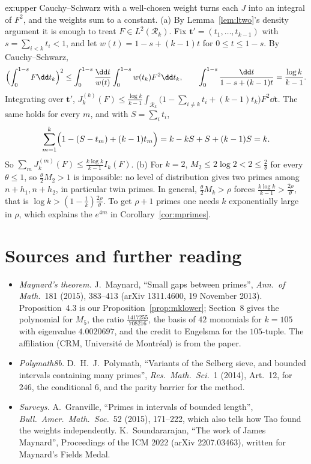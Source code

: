 \begin{solution}{ex:upper}
\idea Cauchy--Schwarz with a well-chosen weight turns each $J$ into an integral of $F^2$, and the weights sum to a constant.
\writeup (a) By Lemma~\ref{lem:ltwo}'s density argument it is enough to treat $F\in L^2(\mathcal R_k)$. Fix $\mathbf t'=(t_1,\dots,t_{k-1})$ with $s=\sum_{i<k}t_i<1$, and let $w(t)=1-s+(k-1)t$ for $0\le t\le1-s$. By Cauchy--Schwarz,
\[
\Bigl(\int_0^{1-s}F\dd t_k\Bigr)^2\le\int_0^{1-s}\frac{\dd t}{w(t)}\int_0^{1-s}w(t_k)F^2\dd t_k,\qquad\int_0^{1-s}\frac{\dd t}{1-s+(k-1)t}=\frac{\log k}{k-1}.
\]
Integrating over $\mathbf t'$, $J_k^{(k)}(F)\le\frac{\log k}{k-1}\int_{\mathcal R_k}\bigl(1-\sum_{i\ne k}t_i+(k-1)t_k\bigr)F^2\dd\mathbf t$. The same holds for every $m$, and with $S=\sum_it_i$,
\[
\sum_{m=1}^k\Bigl(1-(S-t_m)+(k-1)t_m\Bigr)=k-kS+S+(k-1)S=k.
\]
So $\sum_mJ_k^{(m)}(F)\le\frac{k\log k}{k-1}I_k(F)$.
(b) For $k=2$, $M_2\le2\log2<2\le\frac2\theta$ for every $\theta\le1$, so $\frac\theta2M_2>1$ is impossible: no level of distribution gives two primes among $n+h_1,n+h_2$, in particular twin primes. In general, $\frac\theta2M_k>\rho$ forces $\frac{k\log k}{k-1}>\frac{2\rho}\theta$, that is $\log k>(1-\frac1k)\frac{2\rho}\theta$. To get $\rho+1$ primes one needs $k$ exponentially large in $\rho$, which explains the $e^{4m}$ in Corollary~\ref{cor:mprimes}.
\end{solution}

\section*{Sources and further reading}

\begin{itemize}
\item \emph{Maynard's theorem.} J.~Maynard, ``Small gaps between primes'', \emph{Ann.\ of Math.}\ 181 (2015), 383--413 (arXiv 1311.4600, 19 November 2013). Proposition~4.3 is our Proposition~\ref{prop:mklower}; Section~8 gives the polynomial for $M_5$, the ratio $\frac{1417255}{708216}$, the basis of $42$ monomials for $k=105$ with eigenvalue $4.0020697$, and the credit to Engelsma for the $105$-tuple. The affiliation (CRM, Université de Montréal) is from the paper.
\item \emph{Polymath8b.} D.~H.~J.~Polymath, ``Variants of the Selberg sieve, and bounded intervals containing many primes'', \emph{Res.\ Math.\ Sci.}\ 1 (2014), Art.~12, for $246$, the conditional $6$, and the parity barrier for the method.
\item \emph{Surveys.} A.~Granville, ``Primes in intervals of bounded length'', \emph{Bull.\ Amer.\ Math.\ Soc.}\ 52 (2015), 171--222, which also tells how Tao found the weights independently. K.~Soundararajan, ``The work of James Maynard'', Proceedings of the ICM 2022 (arXiv 2207.03463), written for Maynard's Fields Medal.
\end{itemize}
